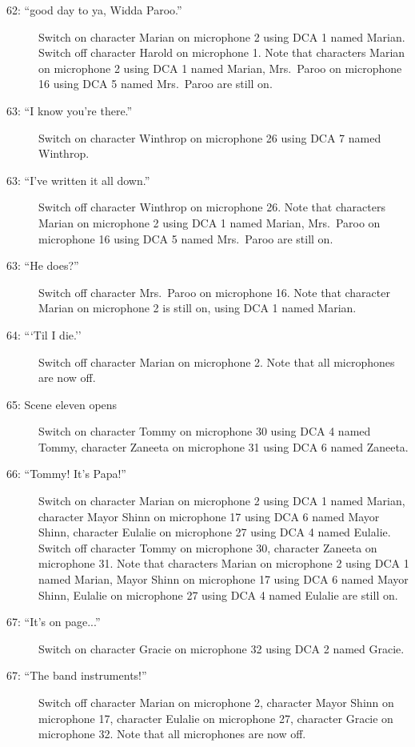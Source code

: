 \begin{description}
\item[62: ``good day to ya, Widda Paroo.'']
Switch on character Marian on microphone 2 using DCA 1 named Marian. Switch off character Harold on microphone 1. Note that characters Marian on microphone 2 using DCA 1 named Marian, Mrs.~Paroo on microphone 16 using DCA 5 named Mrs.~Paroo are still on.  

\item[63: ``I know you're there.'']
Switch on character Winthrop on microphone 26 using DCA 7 named Winthrop. 

\item[63: ``I've written it all down.'']
Switch off character Winthrop on microphone 26. Note that characters Marian on microphone 2 using DCA 1 named Marian, Mrs.~Paroo on microphone 16 using DCA 5 named Mrs.~Paroo are still on.  

\item[63: ``He does?'']
Switch off character Mrs.~Paroo on microphone 16. Note that character Marian on microphone 2 is still on, using DCA 1 named Marian.

\item[64: ```Til I die.'']
Switch off character Marian on microphone 2. Note that all microphones are now off.

\item[65: Scene eleven opens]
Switch on character Tommy on microphone 30 using DCA 4 named Tommy, character Zaneeta on microphone 31 using DCA 6 named Zaneeta. 

\item[66: ``Tommy!  It's Papa!'']
Switch on character Marian on microphone 2 using DCA 1 named Marian, character Mayor Shinn on microphone 17 using DCA 6 named Mayor Shinn, character Eulalie on microphone 27 using DCA 4 named Eulalie. Switch off character Tommy on microphone 30, character Zaneeta on microphone 31. Note that characters Marian on microphone 2 using DCA 1 named Marian, Mayor Shinn on microphone 17 using DCA 6 named Mayor Shinn, Eulalie on microphone 27 using DCA 4 named Eulalie are still on.  

\item[67: ``It's on page...'']
Switch on character Gracie on microphone 32 using DCA 2 named Gracie. 

\item[67: ``The band instruments!'']
Switch off character Marian on microphone 2, character Mayor Shinn on microphone 17, character Eulalie on microphone 27, character Gracie on microphone 32. Note that all microphones are now off.


\end{description}
